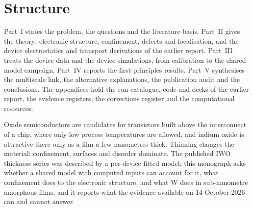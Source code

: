 \section{Structure}
\label{sec:mono-intro-structure}

Part~I states the problem, the questions and the literature basis. Part~II gives the theory: electronic structure, confinement,
defects and localisation, and the device electrostatics and transport derivations of the earlier report. Part~III treats
the device data and the device simulations, from calibration to the shared-model campaign. Part~IV reports the
first-principles results. Part~V synthesises the multiscale link, the alternative explanations, the publication audit and
the conclusions. The appendices hold the run catalogue, code and decks of the earlier report, the evidence registers, the
corrections register and the computational resources.

\begin{keyresult}
Oxide semiconductors are candidates for transistors built above the interconnect of a chip, where only low process
temperatures are allowed, and indium oxide is attractive there only as a film a few nanometres thick. Thinning changes the
material: confinement, surfaces and disorder dominate. The published IWO thickness series was described by a per-device
fitted model; this monograph asks whether a shared model with computed inputs can account for it, what confinement does
to the electronic structure, and what W does in sub-nanometre amorphous films, and it reports what the evidence available
on 14 October 2026 can and cannot answer.
\end{keyresult}
